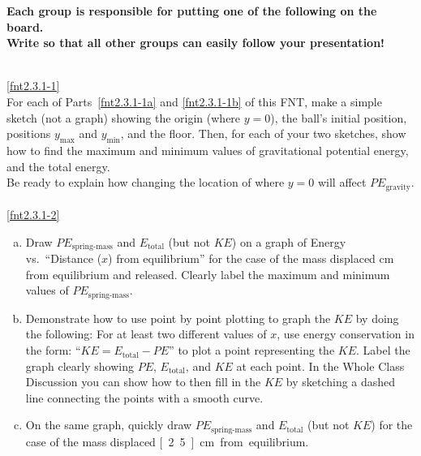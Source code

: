 \begin{center}\noindent\textbf{Each group is responsible for putting one of the following on the board.\\ Write so that all other groups can easily follow your presentation!}\end{center}

\noindent{}\\

\noindent\ref{fnt2.3.1-1}\\

\noindent For each of Parts~\eqref{fnt2.3.1-1a} and \eqref{fnt2.3.1-1b} of this FNT, make a simple sketch (not a graph) showing the origin 
(where $y = 0$), the ball's initial position, positions $y_\text{max}$ and $y_\text{min}$, and the floor. Then, for each of your two sketches, show how to find the maximum and minimum values of gravitational potential energy, and the total energy.\\

\noindent Be ready to explain how changing the location of where $y = 0$ will affect $PE_\text{gravity}$.\\

\noindent{}\\

\noindent\ref{fnt2.3.1-2}

\begin{enumerate}[(a)]
	\item Draw $PE_\text{spring-mass}$ and $E_\text{total}$ (but not $KE$) on a graph of Energy vs.\ ``Distance ($x$) from equilibrium'' for the case of the mass displaced \unit[5]{cm} from equilibrium and released. Clearly label the maximum and minimum values of $PE_\text{spring-mass}$.
	
	\item Demonstrate how to use point by point plotting to graph the $KE$ by doing the following: For at least two different values of $x$, use energy conservation in the form: ``$KE = E_\text{total} - PE$'' to plot a point representing the $KE$. Label the graph clearly showing $PE$, $E_\text{total}$, and $KE$ at each point. In the Whole Class Discussion you can show how to then fill in the $KE$ by sketching a dashed line connecting the points with a smooth curve.
	
	\item On the same graph, quickly draw $PE_\text{spring-mass}$ and $E_\text{total}$ (but not $KE$) for the case of the mass displaced \unit[2.5]{cm} from equilibrium.
\end{enumerate}

